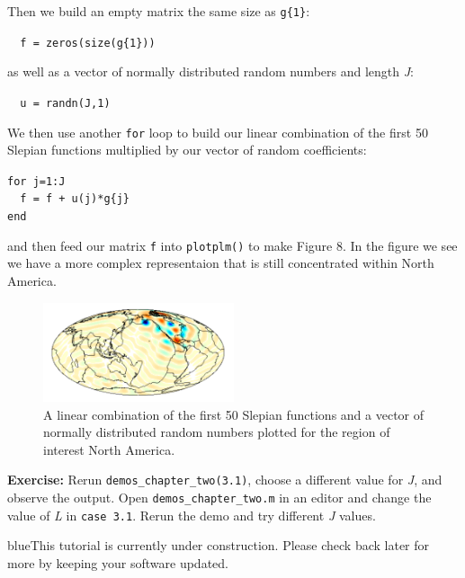 \documentclass[11pt]{article}
\newcommand{\TAG}{\begin{color}{blue}This tutorial is currently under construction. Please check back later for more by keeping your software updated.\end{color}}
\begin{document}
Then we build an empty matrix the same size as \verb|g{1}|:

\verb|	f = zeros(size(g{1}))|

as well as a vector of normally distributed random numbers and length \textit{J}:

\verb|	u = randn(J,1)|

We then use another \verb|for| loop to build our linear combination of the first 50 Slepian functions multiplied by our vector of random coefficients:

\verb|for j=1:J| \\
\verb|	f = f + u(j)*g{j}| \\
\verb|end|

and then feed our matrix \verb|f| into \verb|plotplm()| to make Figure 8. In the figure we see we have a more complex representaion that is still concentrated within North America.

\begin{figure}[H]
  \centering
  \includegraphics[width=0.5\textwidth]{figures/figure8.png}
  \caption{A linear combination of the first 50 Slepian functions and a vector of normally distributed random numbers plotted for the region of interest North America.}
\label{figure8}
\end{figure}

\textbf{Exercise:} Rerun \verb|demos_chapter_two(3.1)|, choose a different value for \textit{J}, and observe the output. Open \verb|demos_chapter_two.m| in an editor and change the value of \textit{L} in \verb|case 3.1|. Rerun the demo and try different \textit{J} values. 

\TAG
\end{document}
